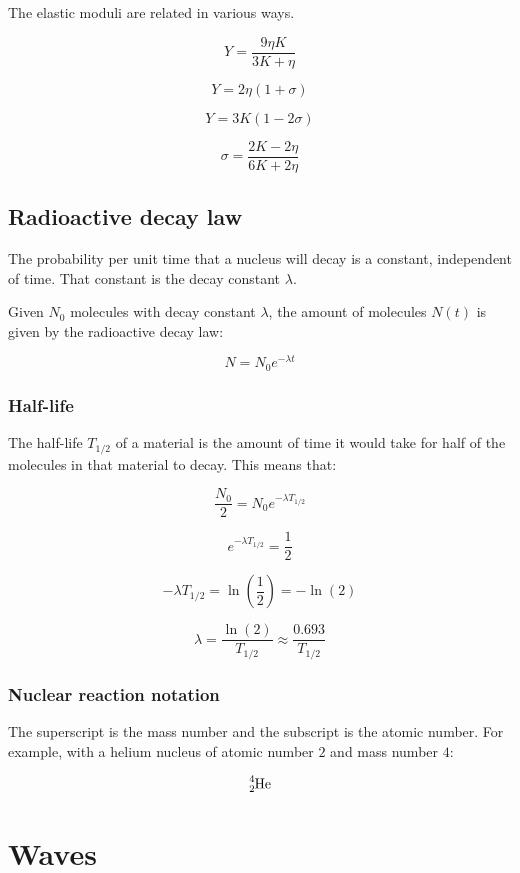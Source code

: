 \documentclass[12pt]{article}
\begin{document}
The elastic moduli are related in various ways.

\[
\boxed{
Y = \frac{9 \eta K}{3K + \eta}
}
\]

\[
\boxed{
Y = 2 \eta (1 + \sigma)
}
\]

\[
\boxed{
Y = 3K(1 - 2\sigma)
}
\]

\[
\boxed{
\sigma = \frac{2K - 2\eta}{6K + 2\eta}
}
\]

\subsection{Radioactive decay law}

The probability per unit time that a nucleus will decay is a constant, independent of time.
That constant is the decay constant $\lambda$.

Given $N_0$ molecules with decay constant $\lambda$, the amount of molecules $N(t)$ is given by the radioactive decay law:

\[
\boxed{
N = N_0 e^{-\lambda t}
}
\]

\subsubsection{Half-life}

The half-life $T_{1/2}$ of a material is the amount of time it would take for half of the molecules in that material to decay.
This means that:

\[
\frac{N_0}{2} = N_0 e^{-\lambda T_{1/2}}
\]

\[
e^{-\lambda T_{1/2}} = \frac{1}{2}
\]

\[
-\lambda T_{1/2} = \ln\left(\frac{1}{2}\right) = -\ln\left(2\right)
\]

\[
\boxed{
\lambda = \frac{\ln(2)}{T_{1/2}} \approx \frac{0.693}{T_{1/2}}
}
\]

\subsubsection{Nuclear reaction notation}

The superscript is the mass number and the subscript is the atomic number.
For example, with a helium nucleus of atomic number $2$ and mass number $4$:

\[
\ce{^4_2He}
\]

\newpage

\section{Waves}
\end{document}
